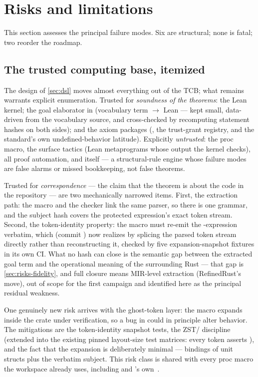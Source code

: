 \section{Risks and limitations}
\label{sec:risks}

This section assesses the principal failure modes. Six are
structural; none is fatal; two reorder the roadmap.

\subsection{The trusted computing base, itemized}
\label{sec:risks-tcb}

The design of \cref{sec:dsl} moves almost everything out of the TCB;
what remains warrants explicit enumeration. Trusted for
\emph{soundness of the theorems}: the Lean kernel; the goal
elaborator in  (vocabulary term $\to$ Lean
 --- kept small, data-driven from the vocabulary source,
and cross-checked by recomputing statement hashes on both sides); and
the axiom packages (, the trust-grant registry,
and the standard's own undefined-behavior latitude). Explicitly
\emph{untrusted}: the proc macro, the surface tactics (Lean
metaprograms whose output the kernel checks), all proof automation,
and  itself --- a structural-rule engine whose failure
modes are false alarms or missed bookkeeping, not false theorems.

Trusted for \emph{correspondence} --- the claim that the theorem is
about the code in the repository --- are two mechanically narrowed
items. First, the extraction path: the macro and the checker link the
same  parser, so there is one grammar, and the
subject hash covers the protected expression's exact token stream.
Second, the token-identity property: the macro must re-emit the
-expression verbatim, which  (commit
) now realizes by splicing the parsed token stream
directly rather than reconstructing it, checked by five expansion-snapshot
fixtures in its own CI. What no hash can close is the
semantic gap between the extracted goal term and the operational
meaning of the surrounding Rust --- that gap is
\cref{sec:risks-fidelity}, and full closure means MIR-level
extraction (RefinedRust's move), out of scope for the first campaign
and identified here as the principal residual weakness.

One genuinely new risk arrives with the ghost-token layer: the macro
expands inside the crate under verification, so a bug in
 could in principle alter behavior. The mitigations
are the token-identity snapshot tests, the ZST/
discipline (extended into the existing pinned layout-size test
matrices: every token asserts ), and the fact that
the expansion is deliberately minimal ---  bindings of unit
structs plus the verbatim subject. This risk class is shared with
every proc macro the workspace already uses, including
 and 's own~\cite{dotnetdll}.

